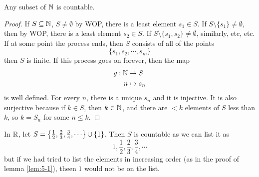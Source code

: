 \documentclass{article}
\begin{document}
\begin{nlemma}\label{lem:5-1}
    Any subset of $\mathbb{N}$ is countable.
\end{nlemma}
\begin{proof}
    If $S \subseteq \mathbb{N}$, $S \neq \emptyset$ by WOP, there is a least element $s_1 \in S$.
    If $S \setminus \{ s_1 \} \neq \emptyset$, then by WOP, there is a least element $s_2 \in S$.
    If $S \setminus \{s_1, s_2\} \neq \emptyset$, similarly, etc, etc.
    If at some point the process ends, then $S$ consists of all of the points
    \[
        \{s_1, s_2, \cdots, s_m\}  
    \]
    then $S$ is finite.
    If this process goes on forever, then the map
    \begin{align*}
        g : \mathbb{N} &\rightarrow S \\
        n &\mapsto s_n
    \end{align*}
    is well defined.
    For every $n$, there is a unique $s_n$ and it is injective.
    It is also surjective because if $k \in S$, then $k \in \mathbb{N}$, and there are $<k$ elements of $S$ less than $k$, so $k = S_n$ for some $n \leq k$.
\end{proof}
\begin{warning}
    In $\mathbb{R}$, let $S = \crbkt{\frac{1}{2}, \frac{2}{3}, \frac{3}{4}, \cdots} \cup \{ 1\}$.
    Then $S$ is countable as we can list it as
    \[
        1, \frac{1}{2}, \frac{2}{3}, \frac{3}{4}, \cdots
    \]
    but if we had tried to list the elements in increasing order (as in the proof of lemma \ref{lem:5-1}), theen $1$ would not be on the list.
\end{warning}
\end{document}
